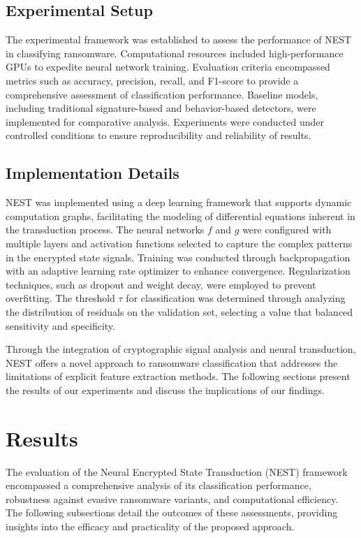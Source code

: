 \documentclass[lettersize,journal]{IEEEtran}
\begin{document}
\subsection{Experimental Setup}

The experimental framework was established to assess the performance of NEST in classifying ransomware. Computational resources included high-performance GPUs to expedite neural network training. Evaluation criteria encompassed metrics such as accuracy, precision, recall, and F1-score to provide a comprehensive assessment of classification performance. Baseline models, including traditional signature-based and behavior-based detectors, were implemented for comparative analysis. Experiments were conducted under controlled conditions to ensure reproducibility and reliability of results.

\subsection{Implementation Details}

NEST was implemented using a deep learning framework that supports dynamic computation graphs, facilitating the modeling of differential equations inherent in the transduction process. The neural networks \( f \) and \( g \) were configured with multiple layers and activation functions selected to capture the complex patterns in the encrypted state signals. Training was conducted through backpropagation with an adaptive learning rate optimizer to enhance convergence. Regularization techniques, such as dropout and weight decay, were employed to prevent overfitting. The threshold \( \tau \) for classification was determined through analyzing the distribution of residuals on the validation set, selecting a value that balanced sensitivity and specificity.

Through the integration of cryptographic signal analysis and neural transduction, NEST offers a novel approach to ransomware classification that addresses the limitations of explicit feature extraction methods. The following sections present the results of our experiments and discuss the implications of our findings.





\section{Results}

The evaluation of the Neural Encrypted State Transduction (NEST) framework encompassed a comprehensive analysis of its classification performance, robustness against evasive ransomware variants, and computational efficiency. The following subsections detail the outcomes of these assessments, providing insights into the efficacy and practicality of the proposed approach.
\end{document}
